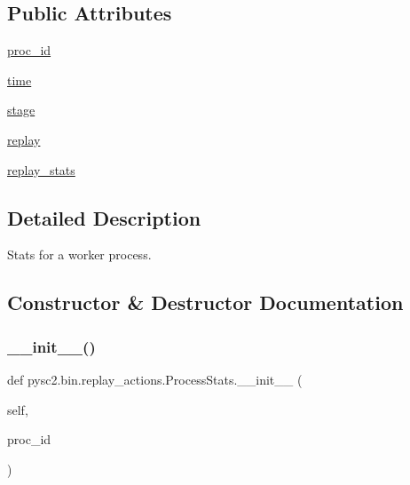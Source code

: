 \subsection*{Public Attributes}
\begin{DoxyCompactItemize}
\item 
\mbox{\hyperlink{classpysc2_1_1bin_1_1replay__actions_1_1_process_stats_a1853b4ef019491644bea9cc55db42654}{proc\+\_\+id}}
\item 
\mbox{\hyperlink{classpysc2_1_1bin_1_1replay__actions_1_1_process_stats_a677fad6f5f0e132264f3dcf2229166a8}{time}}
\item 
\mbox{\hyperlink{classpysc2_1_1bin_1_1replay__actions_1_1_process_stats_a57e9ffbecc64afaa3159edf73f548f23}{stage}}
\item 
\mbox{\hyperlink{classpysc2_1_1bin_1_1replay__actions_1_1_process_stats_aa464f0a2c9a91d7ca08051ccd2d71caa}{replay}}
\item 
\mbox{\hyperlink{classpysc2_1_1bin_1_1replay__actions_1_1_process_stats_aee61a2c7779777fd7cd3be21b69ba768}{replay\+\_\+stats}}
\end{DoxyCompactItemize}


\subsection{Detailed Description}
\begin{DoxyVerb}Stats for a worker process.\end{DoxyVerb}
 

\subsection{Constructor \& Destructor Documentation}
\mbox{\label{classpysc2_1_1bin_1_1replay__actions_1_1_process_stats_ab0ce6dc1c085905ac44fa0a957d12244}} 
\subsubsection{\texorpdfstring{\+\_\+\+\_\+init\+\_\+\+\_\+()}{\_\_init\_\_()}}
{\footnotesize\ttfamily def pysc2.\+bin.\+replay\+\_\+actions.\+Process\+Stats.\+\_\+\+\_\+init\+\_\+\+\_\+ (\begin{DoxyParamCaption}\item[{}]{self,  }\item[{}]{proc\+\_\+id }\end{DoxyParamCaption})}



